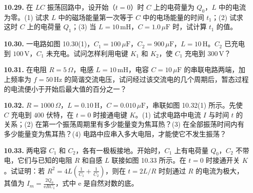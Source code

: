 \vfill
\newpage

\textbf{10.29.} 在 $LC$ 振荡回路中，设开始（$t = 0$）时 $C$ 上的电荷量为 $Q_0$，$L$ 中的电流为零。(1) 试求 $L$ 中的磁场能量第一次等于 $C$ 中的电场能量的时间 $t_1$；(2) 试求这时 $C$ 上的电荷量 $Q_1$；(3) 当 $L = 10\,\mathrm{mH}$，$C = 1.0\,\mu\mathrm{F}$ 时，试计算 $t_1$ 的值。

\vfill
\newpage

\textbf{10.30.} 一电路如图 10.30(1)，$C_1 = 100\,\mu\mathrm{F}$，$C_2 = 900\,\mu\mathrm{F}$，$L = 10\,\mathrm{H}$。$C_2$ 已充电到 $100\,\mathrm{V}$，$C_1$ 未充电。试问怎样利用电键 $K_1$ 和 $K_2$，使 $C_1$ 充电到 $300\,\mathrm{V}$？

\begin{center}
\end{center}

\vfill
\newpage

\textbf{10.31.} 在电阻 $R = 5\,\Omega$，电感 $L = 10\,\mathrm{mH}$，电容 $C = 10\,\mu\mathrm{F}$ 的串联电路两端，加上频率为 $f = 50\,\mathrm{Hz}$ 的简谐交流电压，试问经过该交流电的几个周期后，暂态过程的电流便小于开始后最大值的百分之一？

\vfill
\newpage

\textbf{10.32.} $R = 1000\,\Omega$，$L = 0.10\,\mathrm{H}$，$C = 0.010\,\mu\mathrm{F}$，串联如图 10.32(1) 所示。先使 $C$ 充电到 $400$ 伏特，在 $t = 0$ 时接通电键 $K$。(1) 试求电路中电流 $I$ 与时间 $t$ 的关系；(2) 在第一个振荡周期里有多少能量变为焦耳热？(3) 在全部振荡时间内有多少能量变为焦耳热？(4) 电路中应串入多大电阻，才能使它不发生振荡？

\begin{center}
\end{center}

\vfill
\newpage

\textbf{10.33.} 两电容 $C_1$ 和 $C_2$，各有一极板接地。开始时，$C_1$ 上有电荷量 $Q_0$，$C_2$ 不带电，它们与已知的电阻 $R$ 和自感 $L$ 联接如图 10.33 所示。在 $t = 0$ 时接通开关 $K$。试证明：若 $\displaystyle R^2 = 4L\left(\frac{1}{C_1} + \frac{1}{C_2}\right)$，则在 $t = 2L / R$ 时刻通过 $R$ 的电流为极大，其值为 $\displaystyle I_m = \frac{2Q_0}{\mathrm{e}RC_1}$，式中 $\mathrm{e}$ 是自然对数的底。

\begin{center}
\end{center}

